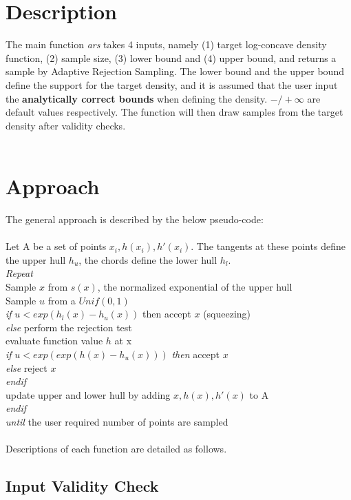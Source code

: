 \documentclass{article}\usepackage[]{graphicx}\usepackage[]{color}
\begin{document}
\section{Description}
\normalsize{The main function \textit{ars} takes 4 inputs, namely (1) target log-concave density }
function, (2) sample size, (3) lower bound and (4) upper bound, and returns a sample 
by Adaptive Rejection Sampling. The lower bound and the upper bound define the support 
for the target density, and it is assumed that the user input the \textbf{analytically correct 
bounds} when defining the density. $-/+ \infty$ are default values respectively.
The function will then draw samples from the target density after validity checks.\\
\\

\section{Approach}
The general approach is described by the below pseudo-code:\\
\\
Let A be a set of points $x_i, h(x_i), h'(x_i)$. The tangents at these points
define the upper hull $h_u$, the chords define the lower hull $h_l$.\\
\textit{Repeat}\\
Sample $x$ from $s(x)$, the normalized exponential of the upper hull\\
Sample $u$ from a $Unif(0,1)$\\
\indent \textit{if} $u < exp(h_l(x) - h_u(x))$ then accept $x$ (squeezing)\\
\indent \textit{else} perform the rejection test\\
\indent \indent evaluate function value $h$ at x\\
\indent \indent \textit{if} $u < exp(exp(h(x) - h_u(x)))$ \textit{then} accept $x$\\
\indent \indent \textit{else} reject $x$\\
\indent \indent \textit{endif}\\
\indent \indent update upper and lower hull by adding {$x, h(x), h'(x)$} to A\\
\indent \textit{endif}\\
\textit{until} the user required number of points are sampled\\
\\
Descriptions of each function are detailed as follows.
\subsection{Input Validity Check}
\end{document}
